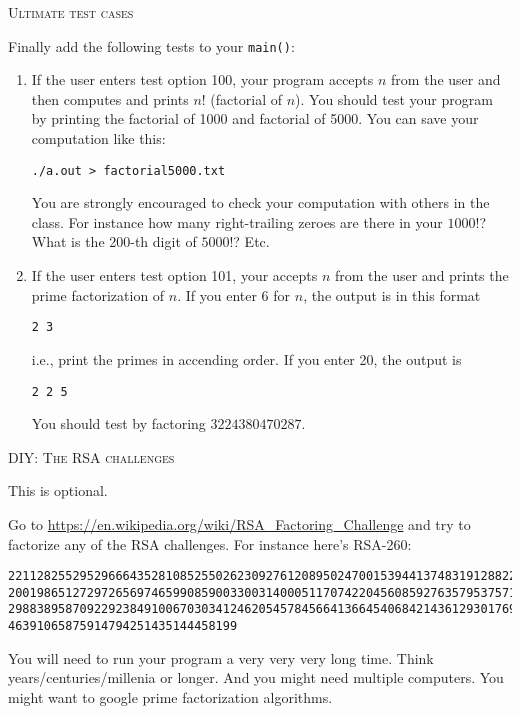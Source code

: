 \newpage
\textsc{Ultimate test cases}

Finally add the following tests to your \verb!main()!:
\begin{enumerate}[nosep]
\item If the user enters test option 100,
your program accepts $n$ from the
user and then computes and prints $n!$ (factorial of $n$).
You should test your program by printing the factorial of 1000 and
factorial of 5000.
You can save your computation like this:
\begin{Verbatim}[frame=single,fontsize=\footnotesize]
./a.out > factorial5000.txt
\end{Verbatim}
You are strongly encouraged to check your computation with others in the
class. For instance how many right-trailing zeroes are there in your
$1000!$? What is the 200-th digit of $5000!$? Etc. 
\item If the user enters test option 101,
your accepts $n$ from the
user and prints the prime factorization of $n$.
If you enter $6$ for $n$, the output is in this format
\begin{Verbatim}[frame=single,fontsize=\footnotesize]
2 3
\end{Verbatim}
i.e., print the primes in accending order.
If you enter 20, the output is
\begin{Verbatim}[frame=single,fontsize=\footnotesize]
2 2 5
\end{Verbatim}
You should test by factoring $3224380470287$.
\end{enumerate}

\newpage
\textsc{DIY: The RSA challenges}

This is optional.

Go to \url{https://en.wikipedia.org/wiki/RSA_Factoring_Challenge}
and try to factorize any of the RSA challenges.
For instance here's RSA-260:
\begin{Verbatim}[fontsize=\footnotesize,frame=single]
2211282552952966643528108525502623092761208950247001539441374831912882294140
2001986512729726569746599085900330031400051170742204560859276357953757185954
2988389587092292384910067030341246205457845664136645406842143612930176940208
46391065875914794251435144458199
\end{Verbatim}
You will need to run your program a very very very long time.
Think years/centuries/millenia or longer.
And you might need multiple computers.
You might want to google prime factorization algorithms.


